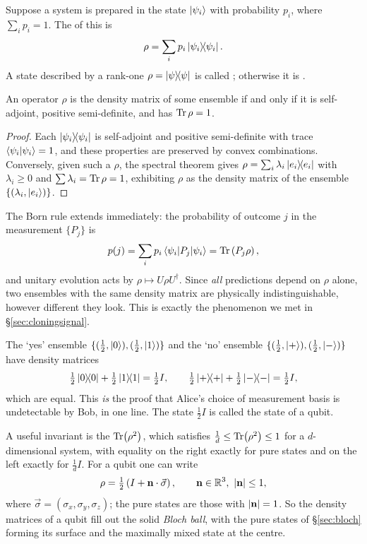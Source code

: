\documentclass[a4paper]{scrartcl}
\begin{document}
\begin{definition}
	Suppose a system is prepared in the state $\ket{\psi_i}$ with probability $p_i$, where $\sum_ip_i=1$. The  of this  is
	$$\rho = \sum_ip_i\op{\psi_i}{\psi_i}.$$
	A state described by a rank-one $\rho = \op{\psi}{\psi}$ is called ; otherwise it is .
\end{definition}

\begin{proposition}
	An operator $\rho$ is the density matrix of some ensemble if and only if it is self-adjoint, positive semi-definite, and has $\Tr\rho = 1$.
\end{proposition}

\begin{proof}
	Each $\op{\psi_i}{\psi_i}$ is self-adjoint and positive semi-definite with trace $\ip{\psi_i}{\psi_i} = 1$, and these properties are preserved by convex combinations. Conversely, given such a $\rho$, the spectral theorem gives $\rho = \sum_i\lambda_i\op{e_i}{e_i}$ with $\lambda_i\geq0$ and $\sum\lambda_i = \Tr\rho = 1$, exhibiting $\rho$ as the density matrix of the ensemble $\{(\lambda_i,\ket{e_i})\}$.
\end{proof}

The Born rule extends immediately: the probability of outcome $j$ in the measurement $\{P_j\}$ is
$$p(j) = \sum_ip_i\mel{\psi_i}{P_j}{\psi_i} = \Tr\left(P_j\rho\right),$$
and unitary evolution acts by $\rho\mapsto U\rho U^\dagger$. Since \emph{all} predictions depend on $\rho$ alone, two ensembles with the same density matrix are physically indistinguishable, however different they look. This is exactly the phenomenon we met in \S\ref{sec:cloningsignal}.

\begin{example}
	The `yes' ensemble $\{(\tfrac12,\ket0),(\tfrac12,\ket1)\}$ and the `no' ensemble $\{(\tfrac12,\ket+),(\tfrac12,\ket-)\}$ have density matrices
	$$\tfrac12\op{0}{0}+\tfrac12\op{1}{1} = \tfrac12 I, \qquad \tfrac12\op{+}{+} + \tfrac12\op{-}{-} = \tfrac12I,$$
	which are equal. This \emph{is} the proof that Alice's choice of measurement basis is undetectable by Bob, in one line. The state $\tfrac12I$ is called the  state of a qubit.
\end{example}

A useful invariant is the  $\Tr(\rho^2)$, which satisfies $\tfrac1d\leq\Tr(\rho^2)\leq1$ for a $d$-dimensional system, with equality on the right exactly for pure states and on the left exactly for $\tfrac1dI$. For a qubit one can write
$$\rho = \tfrac12\left(I + \vv{n}\cdot\vec\sigma\right), \qquad \vv n\in\R^3,\ \abs{\vv n}\leq1,$$
where $\vec\sigma = (\sigma_x,\sigma_y,\sigma_z)$; the pure states are those with $\lvert\mathbf{n}\rvert=1$. So the density matrices of a qubit fill out the solid \emph{Bloch ball}, with the pure states of \S\ref{sec:bloch} forming its surface and the maximally mixed state at the centre.
\end{document}
